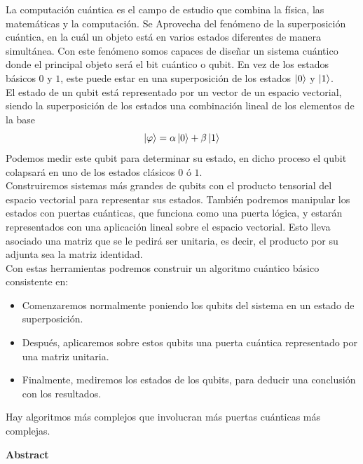 \documentclass[a4paper]{article}
\numberwithin{equation}{section}
\begin{document}
La computación cuántica es el campo de estudio que combina la física, las matemáticas y la computación. Se Aprovecha del fenómeno de la superposición cuántica, en la cuál un objeto está en varios estados diferentes de manera simultánea. Con este fenómeno somos capaces de diseñar un sistema cuántico donde el principal objeto será el bit cuántico o qubit. En vez de los estados básicos $0$ y $1$, este puede estar en una superposición de los estados $\ket{0}$ y $\ket{1}$.\\
El estado de un qubit está representado por un vector de un espacio vectorial, siendo la superposición de los estados una combinación lineal de los elementos de la base
\begin{equation}
\ket{\varphi} = \alpha \ket{0} + \beta \ket{1}
\end{equation}
Podemos medir este qubit para determinar su estado, en dicho proceso el qubit colapsará en uno de los estados clásicos $0$ ó $1$.\\
Construiremos sistemas más grandes de qubits con el producto tensorial del espacio vectorial para representar sus estados. También podremos manipular los estados con puertas cuánticas, que funciona como una puerta lógica, y estarán representados con una aplicación lineal sobre el espacio vectorial. Esto lleva asociado una matriz que se le pedirá ser unitaria, es decir, el producto por su adjunta sea la matriz identidad.\\
\linebreak
Con estas herramientas podremos construir un algoritmo cuántico básico consistente en:
\begin{itemize}
\item Comenzaremos normalmente poniendo los qubits del sistema en un estado de superposición.

\item Después, aplicaremos sobre estos qubits una puerta cuántica representado por una matriz unitaria.

\item Finalmente, mediremos los estados de los qubits, para deducir una conclusión con los resultados.
\end{itemize}
Hay algoritmos más complejos que involucran más puertas cuánticas más complejas.\\

\begin{center}
\textbf{\Large Abstract}
\end{center}
\vspace{0.5cm}
\end{document}
